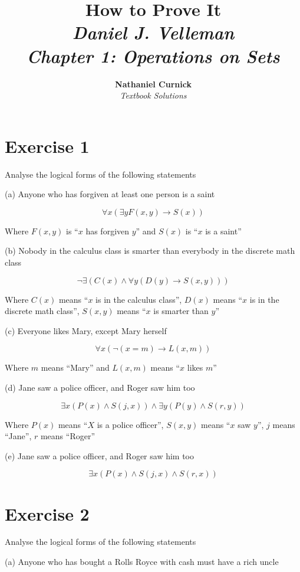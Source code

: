 \documentclass[11pt]{article}
\title{\textbf{How to Prove It} \\ {\Large\itshape Daniel J. Velleman} \\ {\Large\itshape Chapter 1: Operations on Sets}}
\author{\textbf{Nathaniel Curnick} \\ \textit{Textbook Solutions}}
\date{}
\newcommand{\then}{\rightarrow}
\begin{document}
\maketitle

\section*{Exercise 1}

\noindent Analyse the logical forms of the following statements

\noindent (a) Anyone who has forgiven at least one person is a saint

$$\forall x (\exists y F(x, y) \then S(x))$$

Where $F(x, y)$ is ``$x$ has forgiven $y$'' and $S(x)$ is ``$x$ is a saint''

\noindent (b) Nobody in the calculus class is smarter than everybody in the 
discrete math class

$$\neg \exists ( C(x) \wedge \forall y (D(y) \then S(x, y)))$$

Where 
$C(x)$ means ``$x$ is in the calculus class'',
$D(x)$ means ``$x$ is in the discrete math class'',
$S(x, y)$ means ``$x$ is smarter than $y$''

\noindent (c) Everyone likes Mary, except Mary herself 

$$\forall x (\neg (x = m) \then L(x, m))$$

Where $m$ means ``Mary'' and $L(x, m)$ means ``$x$ likes $m$''

\noindent (d) Jane saw a police officer, and Roger saw him too 

$$\exists x (P(x) \wedge S(j, x)) \wedge \exists y (P(y) \wedge S(r, y))$$

Where 
$P(x)$ means ``$X$ is a police officer'',
$S(x, y)$ means ``$x$ saw $y$'',
$j$ means ``Jane'',
$r$ means ``Roger''

\noindent (e) Jane saw a police officer, and Roger saw him too 

$$\exists x (P(x) \wedge S(j, x) \wedge S(r, x))$$

\section*{Exercise 2}

\noindent Analyse the logical forms of the following statements

\noindent (a) Anyone who has bought a Rolls Royce with cash must have a rich uncle 
\end{document}
